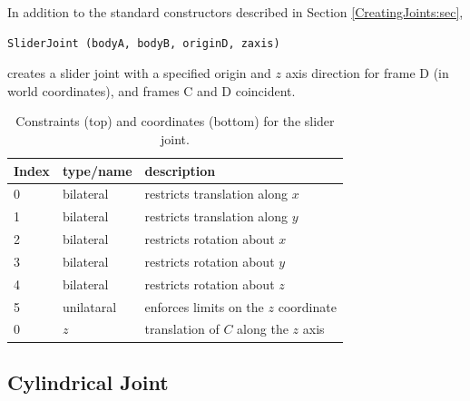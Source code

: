 In addition to the standard constructors described in
Section \ref{CreatingJoints:sec},
%
\begin{lstlisting}[]
  SliderJoint (bodyA, bodyB, originD, zaxis)
\end{lstlisting}
%
creates a slider joint with a specified origin and $z$ axis direction
for frame D (in world coordinates), and frames C and D coincident.

\begin{table}[h]
\centering
\begin{tabular}{|l|l|l|}
\hline
Index & type/name & description \\
\hline
0 & bilateral & restricts translation along $x$ \\
1 & bilateral & restricts translation along $y$ \\
2 & bilateral & restricts rotation about $x$ \\
3 & bilateral & restricts rotation about $y$ \\
4 & bilateral & restricts rotation about $z$ \\
5 & unilataral & enforces limits on the $z$ coordinate \\
\hline
\hline
0 & $z$ & translation of $C$ along the $z$ axis \\
\hline
\end{tabular}
\caption{Constraints (top) and coordinates (bottom) for the slider joint.}
\label{SliderConstraints:tbl}
\end{table}

\subsection{Cylindrical Joint}

